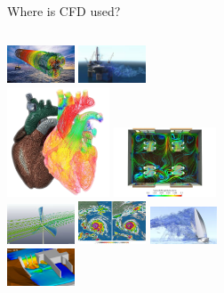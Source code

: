 \documentclass[10pt]{beamer}
\begin{document}
\begin{frame}{Where is CFD used?}
\begin{columns}
\begin{column}{0.7\textwidth}
\includegraphics[height=0.15\columnwidth,width=2.0cm]{./figs/app5.jpeg}
\includegraphics[height=0.15\columnwidth,width=2.0cm]{./figs/app6.jpg}\\
\includegraphics[height=0.20\columnwidth,width=3.05cm]{./figs/app13.png}
\includegraphics[height=0.20\columnwidth,width=3.05cm]{./figs/app14.jpg}\\
\includegraphics[height=0.15\columnwidth,width=2.0cm]{./figs/app7.jpeg}
\includegraphics[height=0.15\columnwidth,width=2.0cm]{./figs/app8.jpeg}
\includegraphics[height=0.15\columnwidth,width=2.0cm]{./figs/app9.jpeg}\\
\includegraphics[height=0.15\columnwidth,width=2.0cm]{./figs/app10.jpg}

\end{column}
\end{columns}
\end{frame}
\end{document}
